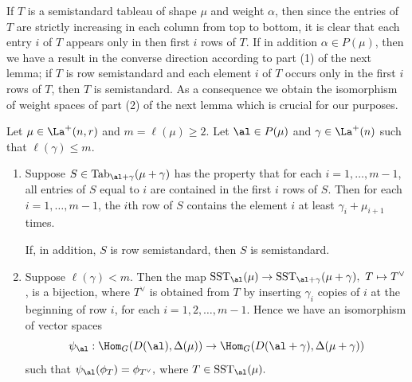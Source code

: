 If $T$ is a semistandard tableau of shape $\mu$ and weight $\alpha$, then since the entries of $T$ are strictly increasing in each column from top to bottom, it is clear that each entry $i$ of $T$ appears only in then first $i$ rows of $T$. If in addition $\alpha \in P(\mu)$, then we have a result in the converse direction according to part (1) of the next lemma; if $T$ is row semistandard and each element $i$ of $T$ occurs only in the first $i$ rows of $T$, then $T$ is semistandard.  As a consequence we obtain the isomorphism of weight spaces of part (2) of the next lemma which is crucial for our purposes.
	\begin{lemma}\label{lem12}Let $\mu\in \La^+(n,r)$ and $m=\ell(\mu) \ge 2$. Let $\al \in P(\mu)$ and $\gamma \in \La^{+}(n)$ such that $\ell(\gamma) \le m$.
	\begin{enumerate}	
	\item  Suppose $S \in \mathrm{Tab}_{\al+\gamma}(\mu+\gamma)$ has the property that for each $i=1,\dots,m-1$, all entries of $S$ equal to $i$ are contained in the first $i$ rows of $S$. Then for each $i=1,\dots,m-1$, the $i$th row of $S$ contains the element $i$ at least $\gamma_i+\mu_{i+1}$ times.
		
			If, in addition, $S$ is row semistandard, then $S$ is semistandard.
			
			\item Suppose $\ell(\gamma) < m$. Then the map $\mathrm{SST}_{\al}(\mu) \to \mathrm{SST}_{\al+\gamma}(\mu+\gamma), \ T \mapsto T^{\vee}$, is a bijection, where $T^{\vee}$ is obtained from $T$ by inserting $\gamma_i$ copies of $i$ at the beginning of row $i$, for each $i=1,2,\dots,m-1$. Hence we have an isomorphism of vector spaces \[\psi_{\al}: \Hom_G(D(\al),\Delta(\mu)) \to \Hom_{G}(D(\al+\gamma),\Delta(\mu+\gamma))\] such that $\psi_{\al}(\phi_T)=\phi_{T^{\vee}},$ where $T \in \mathrm{SST}_{\al}(\mu).$ \end{enumerate}	\end{lemma}
